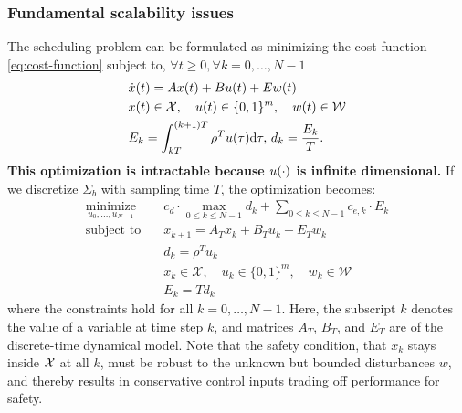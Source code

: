 \subsubsection{Fundamental scalability issues}
The %
scheduling problem can be formulated as minimizing the cost function \eqref{eq:cost-function} subject to, %
$\forall t \geq 0, \forall k = 0, \ldots, N - 1$
\begin{align*}
  & \dot{x} (t) = Ax (t) + Bu (t) + Ew (t)\\%
  & x (t) \in \mathcal{X}, \quad u(t) \in \{0,1\}^{m}, \quad w (t) \in \mathcal{W}\\%
  & E_k = \int_{kT}^{(k + 1) T} \rho^T u (\tau) \mathd \tau, \, d_k = \frac{E_k}{T}%
    \text.
\end{align*}
\textbf{This optimization is intractable because $u (\cdot)$ is infinite
dimensional.}
If we discretize $\Sigma_b$ with sampling time $T$, %
the optimization becomes:
\begin{align}
  \operatorname*{minimize}_{u_{0}, \ldots, u_{N - 1}} \quad & c_d \cdot \max_{0
  \leqslant k \leqslant N - 1} d_k + \textstyle\sum_{0 \leqslant k \leqslant N - 1}
  c_{e, k} \cdot E_k  \label{eq:MILP}\\
  \text{subject to} \quad & x_{k+1} = A_{T} x_{k} + B_{T} u_{k} + E_{T} w_{k}  \nonumber\\
  & d_k = \rho^T u_{k} \nonumber\\
  & x_{k} \in \mathcal{X}, \quad u_{k} \in \{0,1\}^{m}, \quad w_{k} \in \mathcal{W} \nonumber\\
  & E_k = T d_k \nonumber
\end{align}
where the constraints hold for all $k = 0, \ldots, N - 1$.
Here, the subscript $k$ denotes the value of a variable at time step $k$, and matrices $A_{T}$, $B_{T}$, and $E_{T}$ are of the discrete-time dynamical model.
Note that the safety condition, that $x_k$ stays inside $\mathcal{X}$ at all $k$, must be robust to the unknown but bounded disturbances $w$, and thereby results in conservative control inputs trading off performance for safety.
